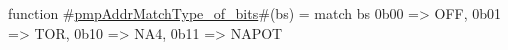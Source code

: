 function #\hyperref[sailRISCVzpmpAddrMatchTypezyofzybits]{pmpAddrMatchType\_of\_bits}#(bs) = {
  match bs {
    0b00 => OFF,
    0b01 => TOR,
    0b10 => NA4,
    0b11 => NAPOT
  }
}
